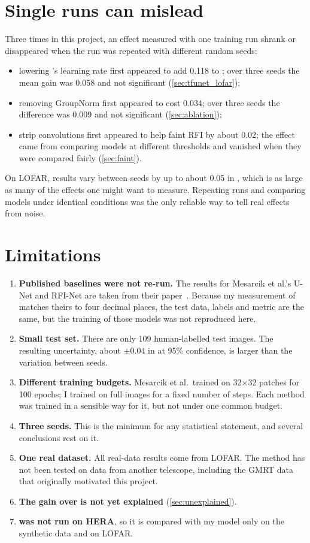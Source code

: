 \section{Single runs can mislead}
Three times in this project, an effect measured with one training run shrank
or disappeared when the run was repeated with different random seeds:
\begin{itemize}
  \item lowering \tfunet{}'s learning rate first appeared to add 0.118 to
    \Fone{}; over three seeds the mean gain was 0.058 and not significant
    (\cref{sec:tfunet_lofar});
  \item removing GroupNorm first appeared to cost 0.034; over three seeds the
    difference was 0.009 and not significant (\cref{sec:ablation});
  \item strip convolutions first appeared to help faint RFI by about 0.02; the
    effect came from comparing models at different thresholds and vanished
    when they were compared fairly (\cref{sec:faint}).
\end{itemize}
On LOFAR, results vary between seeds by up to about 0.05 in \Fone{}, which is as
large as many of the effects one might want to measure. Repeating runs and
comparing models under identical conditions was the only reliable way to tell
real effects from noise.

\section{Limitations}
\begin{enumerate}
  \item \textbf{Published baselines were not re-run.} The results for
    Mesarcik et al.'s U-Net and RFI-Net are taken from their
    paper~\cite{mesarcik2022}. Because my measurement of \aoflagger{} matches
    theirs to four decimal places, the test data, labels and metric are the
    same, but the training of those models was not reproduced here.
  \item \textbf{Small test set.} There are only 109 human-labelled test images.
    The resulting uncertainty, about $\pm0.04$ in \Fone{} at 95\% confidence, is
    larger than the variation between seeds.
  \item \textbf{Different training budgets.} Mesarcik et al.\ trained on
    32$\times$32 patches for 100 epochs; I trained on full images for a fixed
    number of steps. Each method was trained in a sensible way for it, but not
    under one common budget.
  \item \textbf{Three seeds.} This is the minimum for any statistical
    statement, and several conclusions rest on it.
  \item \textbf{One real dataset.} All real-data results come from LOFAR. The
    method has not been tested on data from another telescope, including the
    GMRT data that originally motivated this project.
  \item \textbf{The gain over \tfunet{} is not yet explained}
    (\cref{sec:unexplained}).
  \item \textbf{\tfunet{} was not run on HERA}, so it is compared with my model
    only on the synthetic data and on LOFAR.
\end{enumerate}

